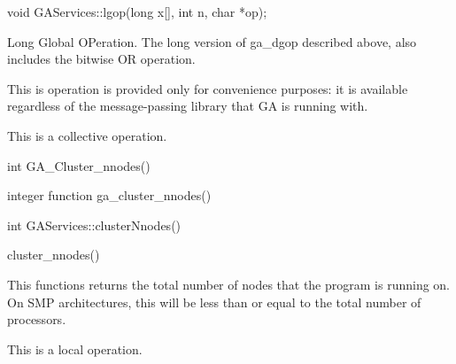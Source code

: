 \documentclass[12pt]{article}
\begin{document}
\begin{cxxapi}
\begin{cxxcode}
void GAServices::lgop(long x[], int n, char *op);
\end{cxxcode}
\begin{funcargs}
\end{funcargs}
\end{cxxapi}
\wcoll

\begin{desc}

Long Global OPeration. The long version of ga_dgop described above,
also includes the bitwise OR operation.

This is operation is provided only for convenience purposes: it is
available regardless of the message-passing library that GA is running with.

This is a collective operation.
\end{desc}


\begin{capi}
\begin{ccode}
int GA_Cluster_nnodes()
\end{ccode}
\end{capi}

\begin{fapi}
\begin{fcode}
integer function ga_cluster_nnodes()
\end{fcode}
\end{fapi}

\begin{cxxapi}
\begin{cxxcode}
int GAServices::clusterNnodes()
\end{cxxcode}
\end{cxxapi}

\begin{pyapi}
\begin{pycode}
cluster_nnodes()
\end{pycode}
\end{pyapi}
\local
\begin{desc}


This functions returns the total number of nodes that the program is running
on. On SMP architectures, this will be less than or equal to the total number
of processors.

This is a  local operation.
\end{desc}
\end{document}
